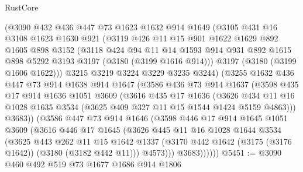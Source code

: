 \begin{lexlean}{RustCore}
\begin{coremodule}
        (@3090
          @432
          @436
          @447
          @73
          @1623
          @1632
          @914
          @1649
          (@3105
            @431
            @16
            @3108
            @1623
            @1630
            @921
            (@3119
              @426
              @11
              @15
              @901
              @1622
              @1629
              @892
              @1605
              @898
              @3152
              (@3118
                @424
                @94
                @11
                @14
                @1593
                @914
                @931
                @892
                @1615
                @898
                @5292
                @3193
                @3197
                (@3180 (@3199 @1616 @914)))
              @3197
              (@3180 (@3199 @1606 @1622)))
            @3215
            @3219
            @3224
            @3229
            @3235
            @3244)
          (@3255
            @1632
            @436
            @447
            @73
            @914
            @1638
            @914
            @1647
            (@3586
              @436
              @73
              @914
              @1637
              (@3598
                @435
                @17
                @914
                @1636
                @1051
                @3609
                (@3616
                  @435
                  @17
                  @1636
                  (@3626
                    @434
                    @11
                    @16
                    @1028
                    @1635
                    @3534
                    (@3625 @409 @327 @11 @15 @1544 @1424 @5159 @4863)))
                @3683))
            (@3586
              @447
              @73
              @914
              @1646
              (@3598
                @446
                @17
                @914
                @1645
                @1051
                @3609
                (@3616
                  @446
                  @17
                  @1645
                  (@3626
                    @445
                    @11
                    @16
                    @1028
                    @1644
                    @3534
                    (@3625
                      @443
                      @262
                      @11
                      @15
                      @1642
                      @1337
                      (@3170 @442 @1642 (@3175 (@3176 @1642)) (@3180 (@3182 @442 @11)))
                      @4573)))
                @3683))))))
@5451 := @3090 @460 @492 @519 @73 @1677 @1686 @914 @1806

\end{coremodule}
\end{lexlean}
